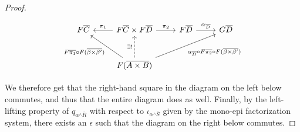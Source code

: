 \documentclass[runningheads]{llncs}
\begin{document}
\begin{proof}
\begin{figure*}[ht]
\begin{minipage}[b]{0.25\linewidth}
{\footnotesize \[
      \begin{tikzcd}[row sep = large]
          F\overline{C}
          &F\overline{C} \times F\overline{D}
          \ar[l, "{\pi_1}"'] \ar[r, "{\pi_2}"]
          &F\overline{D}
          \ar[r, "{\alpha_{\ol{D}}}"]
          &G\overline{D}\\
          &F(\overline{A \times B})
          \ar[u, dashed, "{\exists !}"]
          \ar[ul, "{F\ol{\pi_1} \circ F(\overline{\beta \times \beta'})}"]
          \ar[urr, "{\alpha_{\ol{D}} \circ F\ol{\pi_2} \circ F(\overline{\beta \times \beta'})}"']
      \end{tikzcd}
      \]}
\end{minipage}
\end{figure*}

\vspace*{-0.3in}

\noindent
We therefore get that the right-hand square in the diagram on the left
below commutes, and thus that the entire diagram does as well.
Finally, by the left-lifting property of
$q_{\alpha^\wedge\overline{R}}$ with respect to
$\iota_{\alpha^\wedge\overline{S}}$ given by the mono-epi
factorization system, there exists an $\epsilon$ such that the diagram
on the right below commutes.


\end{proof}
\end{document}
